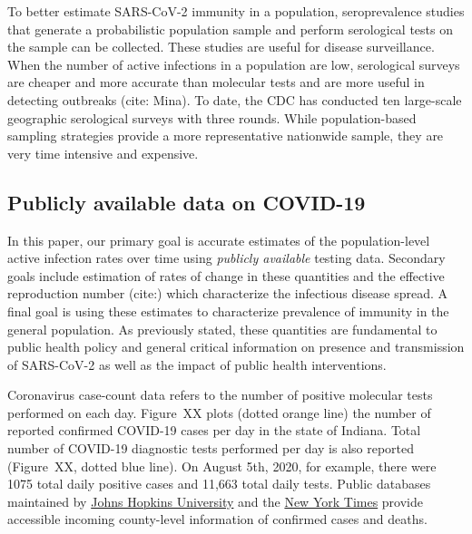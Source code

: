 \documentclass[12pt]{amsart}
\numberwithin{equation}{section}
\theoremstyle{plain}
\begin{document}
To better estimate SARS-CoV-2 immunity in a population, seroprevalence studies that generate a probabilistic population sample and perform serological tests on the sample can be collected.  These studies are useful for disease surveillance. When the number of active infections in a population are low, serological surveys are cheaper and more accurate than molecular tests and are more useful in detecting outbreaks (cite: Mina). To date, the CDC has conducted ten large-scale geographic serological surveys with three rounds.  While population-based sampling strategies provide a more representative nationwide sample, they are very time intensive and expensive.

\subsection{Publicly available data on COVID-19}
\label{section:testinginfo}

In this paper, our primary goal is accurate estimates of the population-level active infection rates over time using \emph{publicly available} testing data.  Secondary goals include estimation of rates of change in these quantities and the effective reproduction number (cite:) which characterize the infectious disease spread.  A final goal is using these estimates to characterize prevalence of immunity in the general population.  As previously stated, these quantities are fundamental to public health policy and general critical information on presence and transmission of SARS-CoV-2 as well as the impact of public health  interventions.



Coronavirus case-count data refers to the number of positive molecular tests performed on each day.  Figure~XX plots (dotted orange line) the number of reported confirmed COVID-19 cases per day in the state of Indiana.  Total number of COVID-19 diagnostic tests performed per day is also reported (Figure~XX, dotted blue line). On August 5th, 2020, for example, there were 1075 total daily positive cases and 11,663 total daily tests.  Public databases maintained by \href{https://bit.ly/2UqFSuA}{Johns Hopkins University} and the \href{https://bit.ly/2vUHfrK}{New York Times} provide accessible incoming county-level information of confirmed cases and deaths.
\end{document}
